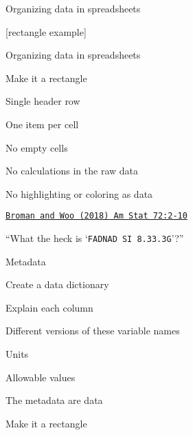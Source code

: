 \documentclass[aspectratio=169,12pt,t]{beamer}
\begin{document}
\begin{frame}[c]{Organizing data in spreadsheets}


  [rectangle example]

  \note{}
\end{frame}




\begin{frame}[c]{Organizing data in spreadsheets}


  \bbi
\item Make it a rectangle
\item Single header row
\item One item per cell
\item No empty cells
\item No calculations in the raw data
\item No highlighting or coloring as data
  \ei

\vspace{8mm}

\hfill
\href{https://doi.org/10.1080/00031305.2017.1375989}{\footnotesize
  \lolit \tt Broman and Woo (2018) Am Stat 72:2-10}

  \note{}
\end{frame}




\begin{frame}[c]{}

\begin{center}
  \Large


``What the heck is `{\hilit \tt FAD{\textunderscore}NAD SI 8.3{\textunderscore}3.3G}'?''

\end{center}


\end{frame}




\begin{frame}[c]{Metadata}

  \bbi
\item Create a data dictionary
  \bi
\item Explain each column
\item Different versions of these variable names
\item Units
\item Allowable values
  \ei
\item The metadata are data
  \bi
\item Make it a rectangle
  \ei
\ei

  \note{}

\end{frame}
\end{document}

